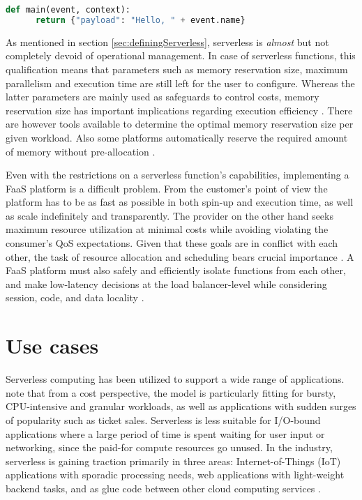 \begin{lstlisting}[language=Python,caption=Example FaaS handler in Python,label=lst:handlerExample]
  def main(event, context):
      return {"payload": "Hello, " + event.name}
\end{lstlisting}

As mentioned in section \ref{sec:definingServerless}, serverless is \textit{almost} but not completely devoid of operational management. In case of serverless functions, this qualification means that parameters such as memory reservation size, maximum parallelism and execution time are still left for the user to configure. Whereas the latter parameters are mainly used as safeguards to control costs, memory reservation size has important implications regarding execution efficiency \parencite{lloydserverless}. There are however tools available to determine the optimal memory reservation size per given workload. Also some platforms automatically reserve the required amount of memory without pre-allocation \parencite{microsoft18azureFunctions}.

Even with the restrictions on a serverless function's capabilities, implementing a FaaS platform is a difficult problem. From the customer's point of view the platform has to be as fast as possible in both spin-up and execution time, as well as scale indefinitely and transparently. The provider on the other hand seeks maximum resource utilization at minimal costs while avoiding violating the consumer's QoS expectations. Given that these goals are in conflict with each other, the task of resource allocation and scheduling bears crucial importance \parencite{reza17controller}. A FaaS platform must also safely and efficiently isolate functions from each other, and make low-latency decisions at the load balancer-level while considering session, code, and data locality \parencite{hendrickson16openlambda}.

\section{Use cases} \label{sec:useCases}

Serverless computing has been utilized to support a wide range of applications. \textcite{baldini17currentTrends} note that from a cost perspective, the model is particularly fitting for bursty, CPU-intensive and granular workloads, as well as applications with sudden surges of popularity such as ticket sales. Serverless is less suitable for I/O-bound applications where a large period of time is spent waiting for user input or networking, since the paid-for compute resources go unused. In the industry, serverless is gaining traction primarily in three areas: Internet-of-Things (IoT) applications with sporadic processing needs, web applications with light-weight backend tasks, and as glue code between other cloud computing services \parencite{spillner18faaster}.

